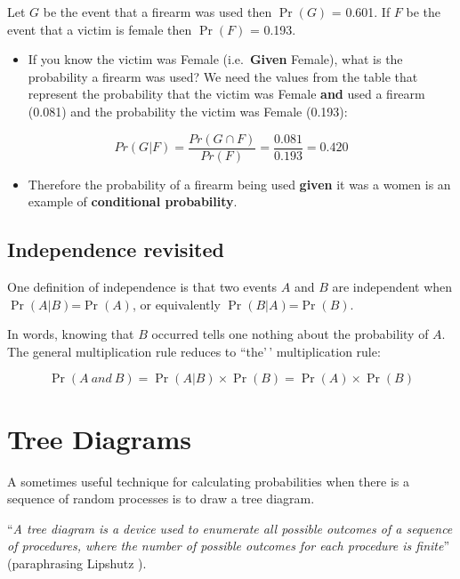 \documentclass[
  oneside]{krantz}
\providecommand{\tightlist}{%
  \setlength{\itemsep}{0pt}\setlength{\parskip}{0pt}}
\begin{document}
Let \(G\) be the event that a firearm was used then \(\Pr(G)\) = 0.601. If \(F\) be the event that a victim is female then \(\Pr(F)\) = 0.193.

\begin{itemize}
\tightlist
\item
  If you know the victim was Female (i.e.~\textbf{Given} Female), what is the probability a firearm was used? We need the values from the table that represent the probability that the victim was Female \textbf{and} used a firearm (0.081) and the probability the victim was Female (0.193):
\end{itemize}

\[Pr(G|F) = \frac{Pr(G \cap F)} {Pr(F)} = \frac{0.081}{0.193} = 0.420\]

\begin{itemize}
\tightlist
\item
  Therefore the probability of a firearm being used \textbf{given} it was a women
  is an example of \textbf{conditional probability}.
\end{itemize}

\hypertarget{independence-revisited}{%
\subsection{Independence revisited}\label{independence-revisited}}

One definition of independence is that two events \(A\) and \(B\) are independent when \(\Pr(A|B)\)=\(\Pr(A)\), or equivalently \(\Pr(B|A)\)=\(\Pr(B)\).

In words, knowing that \(B\) occurred tells one nothing about the probability of \(A\). The general multiplication rule reduces to ``the'\,' multiplication rule:

\[
    \Pr(A ~and~ B)  =  \Pr(A|B) \times \Pr(B) = \Pr(A) \times \Pr(B) 
\]

\hypertarget{tree-diagrams}{%
\section{Tree Diagrams}\label{tree-diagrams}}

A sometimes useful technique for calculating probabilities when there is a sequence
of random processes is to draw a tree diagram.

``\emph{A tree diagram is a device used to enumerate all possible outcomes of a sequence of procedures, where the number of possible outcomes for each procedure is finite}''
(paraphrasing Lipshutz \citeyearpar{Lipshutz2011}).
\end{document}
